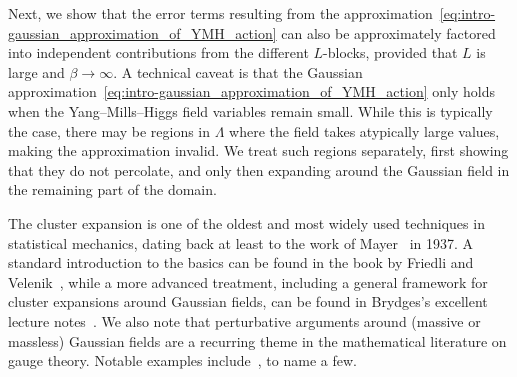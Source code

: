 \documentclass[11pt]{article}
\theoremstyle{definition}
\theoremstyle{remark}
\numberwithin{theorem}{section}
\begin{document}
    Next, we show that the error terms resulting from the approximation~\eqref{eq:intro-gaussian_approximation_of_YMH_action} can also be approximately factored into independent contributions from the different $L$-blocks, provided that $L$ is large and $\beta \to \infty$. A technical caveat is that the Gaussian approximation~\eqref{eq:intro-gaussian_approximation_of_YMH_action} only holds when the Yang--Mills--Higgs field variables remain small. While this is typically the case, there may be regions in $\Lambda$ where the field takes atypically large values, making the approximation invalid. We treat such regions separately, first showing that they do not percolate, and only then expanding around the Gaussian field in the remaining part of the domain.

    The cluster expansion is one of the oldest and most widely used techniques in statistical mechanics, dating back at least to the work of Mayer~\cite{Mayer} in 1937. A standard introduction to the basics can be found in the book by Friedli and Velenik~\cite[Chapter~5]{Friedli-Velenik_book}, while a more advanced treatment, including a general framework for cluster expansions around Gaussian fields, can be found in Brydges's excellent lecture notes~\cite{Brydges-course}. We also note that perturbative arguments around (massive or massless) Gaussian fields are a recurring theme in the mathematical literature on gauge theory. Notable examples include~\cite{Balaban-Imbrie-Jaffe-Brydges, Chatterjee-HiggsMechanism, Frohlich-Spencer,Garban-Sepulveda-IMRN2023, Glimm-Jaffe-Spencer, Osterwalder-Seiler, Seiler-book}, to name a few. 
\end{document}
